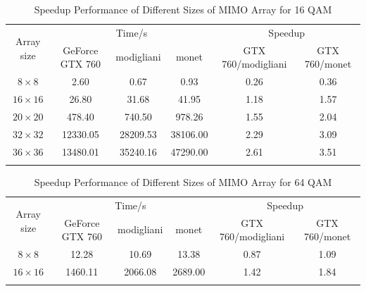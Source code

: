 \documentclass[12pt,a4paper,final]{article}
\begin{document}
\begin{spacing}{2.5}
\begin{table}[htb]
\begin{tabular}{|c|c|c|c|c|c|}
\end{tabular}
\end{table}



\begin{table}[htb]
\caption{Speedup Performance of Different Sizes of MIMO Array for 16 QAM}
\centering
\begin{tabular}{|c|c|c|c|c|c|}
\hline
\multirow{2}{*}{ Array size} & \multicolumn{3}{|c|}{Time/s} & \multicolumn{2}{|c|}{Speedup}\\
\cline{2-6}
&GeForce GTX 760 & modigliani & monet &  GTX 760/modigliani  &  GTX 760/monet \\
\hline
$8\times 8$&2.60& 0.67&0.93 & 0.26&0.36 \\
\hline
$16\times 16$&26.80 & 31.68&41.95& 1.18& 1.57\\
\hline
$20\times 20$&478.40 & 740.50& 978.26& 1.55& 2.04\\
\hline
$32\times 32$&12330.05& 28209.53& 38106.00& 2.29& 3.09\\
\hline
$36\times 36$& 13480.01&35240.16&47290.00&2.61& 3.51 \\

\hline
\label{speedup1}

\end{tabular}
\end{table}

\begin{table}[htb]
\caption{Speedup Performance of Different Sizes of MIMO Array for 64 QAM}
\centering
\begin{tabular}{|c|c|c|c|c|c|}
\hline
\multirow{2}{*}{ Array size} & \multicolumn{3}{|c|}{Time/s} & \multicolumn{2}{|c|}{Speedup}\\
\cline{2-6}
&GeForce GTX 760 & modigliani & monet &  GTX 760/modigliani  &  GTX 760/monet \\
\hline
$8\times 8$&12.28& 10.69&13.38 & 0.87&1.09 \\
\hline
$16\times 16$&1460.11 & 2066.08&2689.00& 1.42& 1.84\\

\hline
\label{speedup1}

\end{tabular}
\end{table}

\end{spacing}
\end{document}
